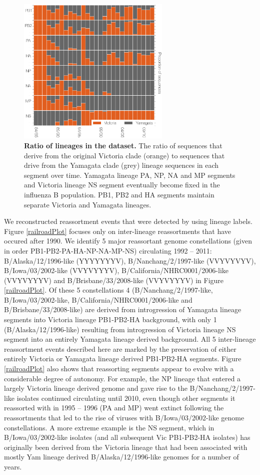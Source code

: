 \documentclass[11pt,oneside,letterpaper]{article}
\begin{document}
\begin{figure}[h]
	\centering	
	\includegraphics[width=0.65\textwidth]	{figures/InfB_LineageRatiosOverTime.png}
	\caption{\textbf{Ratio of lineages in the dataset.}
The ratio of sequences that derive from the original Victoria clade (orange) to sequences that drive from the Yamagata clade (grey) lineage sequences in each segment over time.
Yamagata lineage PA, NP, NA and MP segments and Victoria lineage NS segment eventually become fixed in the influenza B population.
PB1, PB2 and HA segments maintain separate Victoria and Yamagata lineages.}
	\label{lineageRatiosOverTime}
\end{figure}

We reconstructed reassortment events that were detected by using lineage labels.
Figure \ref{railroadPlot} focuses only on inter-lineage reassortments that have occured after 1990.
We identify 5 major reassortant genome constellations (given in order PB1-PB2-PA-HA-NP-NA-MP-NS) circulating 1992 -- 2011: B/Alaska/12/1996-like (YYYYYYYV), B/Nanchang/2/1997-like (VVYVYVYV), B/Iowa/03/2002-like (VVYVYYYV), B/California/NHRC0001/2006-like (VVYVYYYV) and B/Brisbane/33/2008-like (VVYVYYYV) in Figure \ref{railroadPlot}.
Of these 5 constellations 4 (B/Nanchang/2/1997-like, B/Iowa/03/2002-like, B/California/NHRC0001/2006-like and B/Brisbane/33/2008-like) are derived from introgression of Yamagata lineage segments into Victoria lineage PB1-PB2-HA background, with only 1 (B/Alaska/12/1996-like) resulting from introgression of Victoria lineage NS segment into an entirely Yamagata lineage derived background.
All 5 inter-lineage reassortment events described here are marked by the preservation of either entirely Victoria or Yamagata lineage derived PB1-PB2-HA segments.
Figure \ref{railroadPlot} also shows that reassorting segments appear to evolve with a considerable degree of autonomy.
For example, the NP lineage that entered a largely Victoria lineage derived genome and gave rise to the B/Nanchang/2/1997-like isolates continued circulating until 2010, even though other segments it reassorted with in 1995 -- 1996 (PA and MP) went extinct following the reassortments that led to the rise of viruses with B/Iowa/03/2002-like genome constellations.
A more extreme example is the NS segment, which in B/Iowa/03/2002-like isolates (and all subsequent Vic PB1-PB2-HA isolates) has originally been derived from the Victoria lineage that had been associated with mostly Yam lineage derived B/Alaska/12/1996-like genomes for a number of years.
\end{document}
